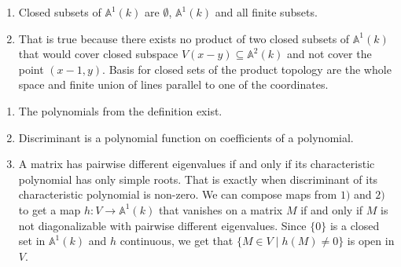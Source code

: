 \newcommand{\sheet}{1}




\maketitle

\begin{exercise}{1}
    \begin{enumerate}
        \item{} Closed subsets of $\mathbb{A}^1(k)$ are $\emptyset$,
            $\mathbb{A}^1(k)$ and all finite subsets.
        \item{} That is true because there exists no product of two closed subsets
            of $\mathbb{A}^1(k)$ that would cover closed subspace $V(x - y)
            \subseteq \mathbb{A}^2(k)$ and not cover the point $(x - 1, y)$.
            Basis for closed sets of the product topology are the whole space
            and finite union of lines parallel to one of the coordinates.
    \end{enumerate}
\end{exercise}

\begin{exercise}{2}
    \begin{enumerate}
        \item The polynomials from the definition exist.
        \item Discriminant is a polynomial function on coefficients of a
            polynomial.
        \item A matrix has pairwise different eigenvalues if and only if its
            characteristic polynomial has only simple roots. That is exactly when
            discriminant of its characteristic polynomial is non-zero. We can
            compose maps from $1)$ and $2)$ to get a map $h \colon V \rightarrow
            \mathbb{A}^1(k)$ that vanishes on a matrix $M$ if and only if $M$ is
            not diagonalizable with pairwise different eigenvalues. Since
            $\{0\}$ is a closed set in $\mathbb{A}^1(k)$ and $h$ continuous, we
            get that $\{ M \in V \mid h(M) \not= 0 \}$ is open in $V$.
    \end{enumerate}
\end{exercise}

